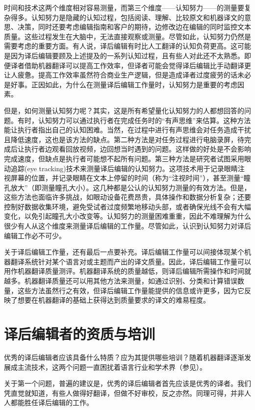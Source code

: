 \documentclass[output=paper,colorlinks,citecolor=brown]{langscibook}
\begin{document}
时间和技术这两个维度相对容易测量，而第三个维度——认知努力——的测量要复杂得多。认知努力是隐藏的认知过程，包括阅读、理解、比较原文和机器译文的意思、决策，同时还要考虑编辑指南和客户的期待，边修改边在编辑的同时监控文本质量。这些过程发生在大脑中，无法直接观察或测量。尽管如此，认知努力仍然是需要考虑的重要方面。有人说，译后编辑有时比人工翻译的认知负荷更高。这可能是因为译后编辑要顾及上述提及的一系列认知过程，且有些人对此还不太熟悉。即便译者借助机器翻译可以提高工作效率，但译者可能会觉得译后编辑比手动翻译更让人疲惫。提高工作效率虽然符合商业生产逻辑，但是造成译者过度疲劳的话未必是好事。正因如此，为什么在测量译后编辑工作量时，认知努力是重要的考虑因素。

但是，如何测量认知努力呢？其实，这是所有希望量化认知努力的人都想回答的问题。有时，认知努力可以通过执行者在完成任务时的“有声思维”来估算。这种方法能让执行者指出自己的认知困难。当然，在过程中进行有声思维会对任务造成干扰且降低速度，这也是该方法的缺点。第二种方法是对任务过程进行电脑录屏，待完成后让执行者边观看回放视频，边回想当时遇到的问题。这样做的好处是不会影响完成速度，但缺点是执行者可能想不起所有问题。第三种方法是研究者试图采用眼动追踪(eye tracking)技术来测量译后编辑的认知努力。这项技术用于记录眼睛注视屏幕的位置，并记录眼睛在文本上停留的时间（称为“注视时间”），甚至测量“瞳孔放大”（即测量瞳孔大小）。这几种都是公认的认知努力测量的有效方法。但是，这些方法也面临许多挑战，如眼动设备花费昂贵，具体操作和数据分析复杂；还要控制好数据收集环境，避免受试者过度频繁地移动头部，或者确保光线不会有大幅变化，以免引起瞳孔大小改变等。认知努力的测量困难重重，因此不难理解为什么很少有人从这个维度来测量译后编辑的工作量。尽管如此，认识到认知努力对译后编辑工作必不可少。

关于译后编辑工作量，还有最后一点要补充。译后编辑工作量可以间接体现某个机器翻译系统针对某个语言对或主题而产出的译文质量。因此，译后编辑工作量可以用作机器翻译质量测评。机器翻译系统的质量越低，则译后编辑所需操作和时间就越多。机器翻译质量还可以用其他方法来测量，如通过识别、分类和计算错误数量，这些方法虽然行之有效，但译后编辑工作量能提供的信息或许更多，因为它反映了想要在机器翻译的基础上获得达到质量要求的译文的难易程度。

\section{译后编辑者的资质与培训}

优秀的译后编辑者应该具备什么特质？应为其提供哪些培训？随着机器翻译逐渐发展成主流技术，这两个问题一直困扰着语言行业和学术界（参见\citealt{NitzkeHansen-Schirra2021}）。

关于第一个问题，普遍的建议是，优秀的译后编辑者首先应该是优秀的译者。我们凭直觉就知道，有些人做得好翻译，但做不好审校，反之亦然。同理可得，并非人人都能胜任译后编辑的工作。
\end{document}
